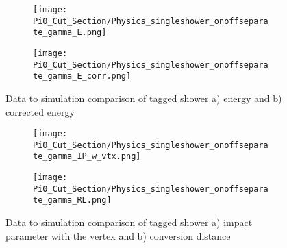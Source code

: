 \documentclass{article}
\begin{document}
\begin{figure}[H]
\centering
  \begin{subfigure}[t]{0.3\textwidth}
    \centering
\texttt{[image: Pi0\_Cut\_Section/Physics\_singleshower\_onoffseparate\_gamma\_E.png]}
  \caption{ }
  \end{subfigure} 
  \hspace{30mm}
  \begin{subfigure}[t]{0.3\textwidth}
    \centering
\texttt{[image: Pi0\_Cut\_Section/Physics\_singleshower\_onoffseparate\_gamma\_E\_corr.png]}
  \caption{ }
  \end{subfigure} 
\caption{ Data to simulation comparison of tagged shower a) energy and b) corrected energy }
\label{fig:physics_singleshower_e}
\end{figure}

\begin{figure}[H]
\centering
  \begin{subfigure}[t]{0.3\textwidth}
    \centering
\texttt{[image: Pi0\_Cut\_Section/Physics\_singleshower\_onoffseparate\_gamma\_IP\_w\_vtx.png]}
  \caption{ }
  \end{subfigure} 
  \hspace{20mm}
  \begin{subfigure}[t]{0.3\textwidth}
    \centering
\texttt{[image: Pi0\_Cut\_Section/Physics\_singleshower\_onoffseparate\_gamma\_RL.png]}
  \caption{ }
  \end{subfigure} 
\caption{ Data to simulation comparison of tagged shower a) impact parameter with the vertex and b) conversion distance }
\label{fig:physics_singleshower_ip}
\end{figure}
\end{document}
